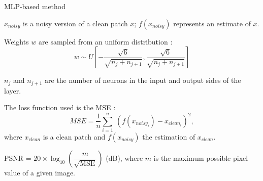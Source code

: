 \documentclass[8pt]{beamer}
\begin{document}
\begin{frame}{MLP-based method}
\begin{figure}[h]
\begin{minipage}[c]{9.5cm}
{
}%
\end{minipage}%
\end{figure}

\vspace{7pt}

$x_{noisy}$ is a noisy version of a clean patch $x$; $f(x_{noisy})$ represents an estimate of $x$.

\end{frame}


\begin{frame}
\begin{mybox}
Weights $w$ are sampled from an uniform distribution :  \\%
$$w \sim U\left[-\frac{\sqrt{6}}{\sqrt{n_j + n_{j+1}}}, \frac{\sqrt{6}}{\sqrt{n_j + n_{j+1}}}\right]$$

{\footnotesize $n_j$ and $n_{j+1}$ are the number of neurons in the input and output sides of the layer.}
\end{mybox}

\begin{mybox}
The loss function used is the MSE : $$MSE = \frac{1}{n} \sum_{i=1}^{n} \ (f(x_{noisy_i})-x_{clean_i})^2,$$ where $x_{clean}$ is a clean patch and $f(x_{noisy})$ the estimation of $x_{clean}$.
\end{mybox}

\begin{mybox}
PSNR = $20 \times \log_{10}\left(\dfrac{m}{\sqrt{\mathrm{MSE}}} \right)$ (dB), where $m$ is the maximum possible pixel value of a given image.
\end{mybox}
\end{frame}
\end{document}
